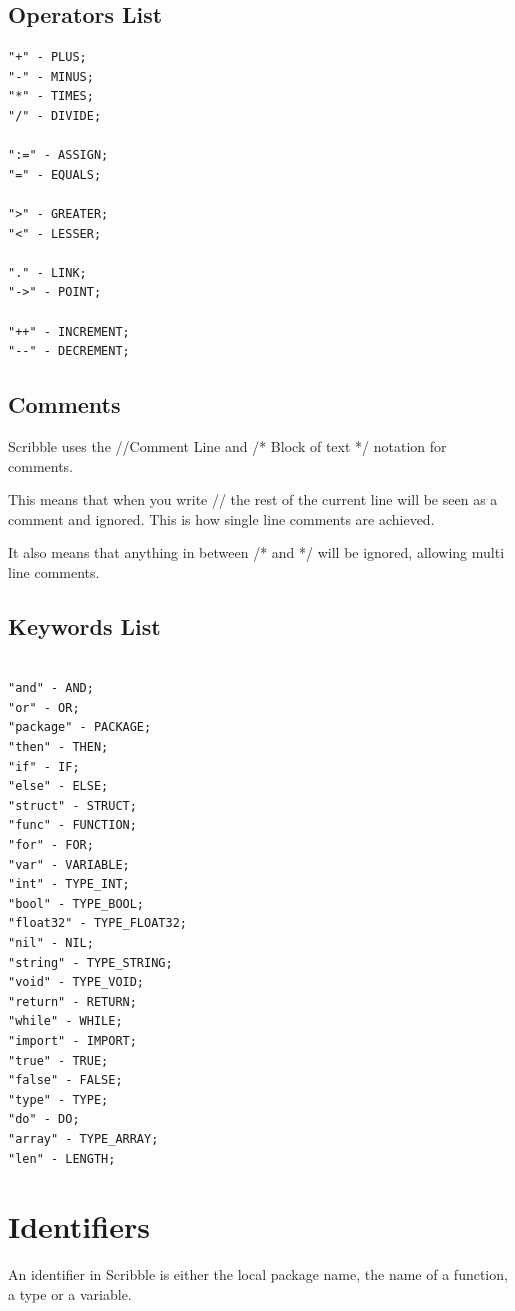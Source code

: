 \documentclass[]{final_report}
\begin{document}
\subsection{Operators List}

\begin{verbatim}
"+" - PLUS;
"-" - MINUS;
"*" - TIMES;
"/" - DIVIDE;

":=" - ASSIGN;
"=" - EQUALS;

">" - GREATER;
"<" - LESSER;

"." - LINK;
"->" - POINT;

"++" - INCREMENT;
"--" - DECREMENT;
\end{verbatim}

\subsection{Comments}

Scribble uses the //Comment Line and /* Block of text */ notation for comments. 

This means that when you write // the rest of the current line will be seen as a comment and ignored. This is how single line comments are achieved.

It also means that anything in between /* and */ will be ignored, allowing multi line comments.

\subsection{Keywords List}

\begin{verbatim}

"and" - AND;
"or" - OR;
"package" - PACKAGE;
"then" - THEN;
"if" - IF;
"else" - ELSE;
"struct" - STRUCT;
"func" - FUNCTION;
"for" - FOR;
"var" - VARIABLE;
"int" - TYPE_INT;
"bool" - TYPE_BOOL;
"float32" - TYPE_FLOAT32;
"nil" - NIL;
"string" - TYPE_STRING;
"void" - TYPE_VOID;
"return" - RETURN;
"while" - WHILE;
"import" - IMPORT;
"true" - TRUE;
"false" - FALSE;
"type" - TYPE;
"do" - DO;
"array" - TYPE_ARRAY;
"len" - LENGTH;

\end{verbatim}

\section{Identifiers}

An identifier in Scribble is either the local package name, the name of a function, a type or a variable.
\end{document}
